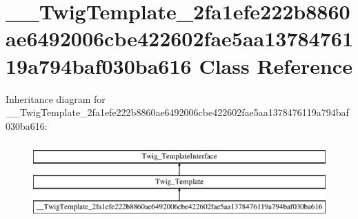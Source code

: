\hypertarget{class_____twig_template__2fa1efe222b8860ae6492006cbe422602fae5aa1378476119a794baf030ba616}{}\section{\+\_\+\+\_\+\+Twig\+Template\+\_\+2fa1efe222b8860ae6492006cbe422602fae5aa1378476119a794baf030ba616 Class Reference}
\label{class_____twig_template__2fa1efe222b8860ae6492006cbe422602fae5aa1378476119a794baf030ba616}
Inheritance diagram for \+\_\+\+\_\+\+Twig\+Template\+\_\+2fa1efe222b8860ae6492006cbe422602fae5aa1378476119a794baf030ba616\+:\begin{figure}[H]
\begin{center}
\leavevmode
\includegraphics[height=3.000000cm]{class_____twig_template__2fa1efe222b8860ae6492006cbe422602fae5aa1378476119a794baf030ba616}
\end{center}
\end{figure}
